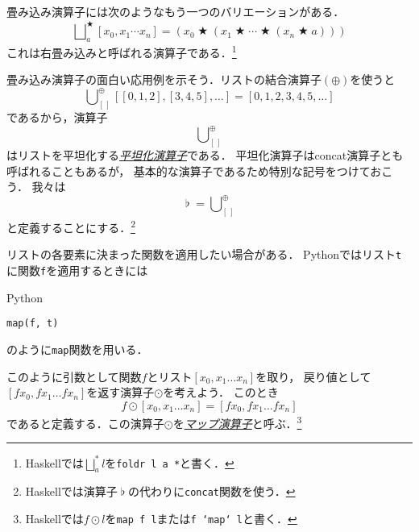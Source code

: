 \documentclass[a5paper,draft]{jsbook}
\newcommand{\programminglanguage}[1]{\textsf{#1}}
\newcommand{\haskell}{\programminglanguage{Haskell}}
\newcommand{\python}{\programminglanguage{Python}}
\newcommand{\keyword}[1]{{\underline{\emph{#1}}}}
\newcommand{\code}[1]{\texttt{#1}}
\newenvironment{pythoncode}{\begin{itembox}[r]{\python}}{\end{itembox}}
\newcommand{\mathEmptyList}{{[\,]}}
\DeclareMathOperator{\mathConcat}{\flat}
\DeclareMathOperator*{\mathFold}{\bigcup}
\DeclareMathOperator*{\mathFoldRight}{\bigsqcup}
\newcommand{\mathAnyBinaryOperator}{\mathbin{\bigstar}}
\newcommand{\mathAppend}{\oplus}
\newcommand{\mathMap}{\mathbin{\odot}}
\begin{document}
畳み込み演算子には次のようなもう一つのバリエーションがある．
\begin{equation}
\mathFoldRight^{\mathAnyBinaryOperator}_{a}[x_0,x_1\dotsb x_n]=\left(x_0\mathAnyBinaryOperator\left(x_1\mathAnyBinaryOperator\dotsb\mathAnyBinaryOperator\left(x_n\mathAnyBinaryOperator a\right)\right)\right)
\end{equation}
これは右畳み込みと呼ばれる演算子である．\footnote{\haskell では$\mathFoldRight^{*}_{a}l$を\code{foldr l a *}と書く．}

畳み込み演算子の面白い応用例を示そう．リストの結合演算子$(\mathAppend)$を使うと
\begin{equation}
\mathFold_\mathEmptyList^\mathAppend[[0,1,2],[3,4,5],\dots]=[0,1,2,3,4,5,\dots]
\end{equation}
であるから，演算子
\begin{equation}
\mathFold_\mathEmptyList^\mathAppend
\end{equation}
はリストを平坦化する\keyword{平坦化演算子}である．
平坦化演算子はconcat演算子とも呼ばれることもあるが，
基本的な演算子であるため特別な記号をつけておこう．
我々は
\begin{equation}
\mathConcat=\mathFold_\mathEmptyList^\mathAppend
\end{equation}
と定義することにする．\footnote{\haskell では演算子$\mathConcat$の代わりに\code{concat}関数を使う．}

リストの各要素に決まった関数を適用したい場合がある．
\python ではリスト\code{t}に関数\code{f}を適用するときには
\begin{pythoncode}
\begin{verbatim}
map(f, t)
\end{verbatim}
\end{pythoncode}
のように\code{map}関数を用いる．

このように引数として関数$f$とリスト$[x_0,x_1\dots x_n]$を取り，
戻り値として$[fx_0,fx_1\dots fx_n]$を返す演算子$\mathMap$を考えよう．
このとき
\begin{equation}
f\mathMap[x_0,x_1\dots x_n]=[fx_0,fx_1\dots fx_n]
\end{equation}
であると定義する．この演算子$\mathMap$を\keyword{マップ演算子}と呼ぶ．\footnote{\haskell では$f\mathMap l$を\code{map f l}または\code{f `map` l}と書く．}
\end{document}
